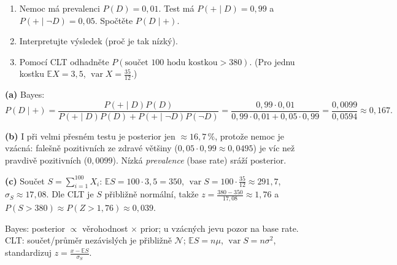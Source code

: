 \begin{zadani}
\begin{enumerate}[label=(\alph*)]
  \item {} Nemoc má prevalenci $P(D)=0{,}01$. Test má $P(+\mid D)=0{,}99$ a $P(+\mid \neg D)=0{,}05$. Spočtěte $P(D\mid +)$.
  \item {} Interpretujte výsledek (proč je tak nízký).
  \item {} Pomocí CLT odhadněte $P(\text{součet }100\text{ hodu kostkou}>380)$. (Pro jednu kostku $\mathbb{E}X=3{,}5$, $\operatorname{var}X=\tfrac{35}{12}$.)
\end{enumerate}
\end{zadani}

\begin{reseni}
\textbf{(a)} Bayes:
\[
P(D\mid+)=\frac{P(+\mid D)P(D)}{P(+\mid D)P(D)+P(+\mid\neg D)P(\neg D)}=\frac{0{,}99\cdot0{,}01}{0{,}99\cdot0{,}01+0{,}05\cdot0{,}99}=\frac{0{,}0099}{0{,}0594}\approx0{,}167.
\]

\textbf{(b)} I při velmi přesném testu je posterior jen $\approx16{,}7\,\%$, protože nemoc je vzácná: falešně pozitivních ze zdravé většiny ($0{,}05\cdot0{,}99\approx0{,}0495$) je víc než pravdivě pozitivních ($0{,}0099$). Nízká \emph{prevalence} (base rate) sráží posterior.

\textbf{(c)} Součet $S=\sum_{i=1}^{100}X_i$: $\mathbb{E}S=100\cdot3{,}5=350$, $\operatorname{var}S=100\cdot\tfrac{35}{12}\approx291{,}7$, $\sigma_S\approx17{,}08$. Dle CLT je $S$ přibližně normální, takže $z=\frac{380-350}{17{,}08}\approx1{,}76$ a $P(S>380)\approx P(Z>1{,}76)\approx0{,}039$.
\end{reseni}

\begin{jadro}
Bayes: posterior $\propto$ věrohodnost $\times$ prior; u vzácných jevu pozor na base rate. CLT: součet/průměr nezávislých je přibližně $\mathcal{N}$; $\mathbb{E}S=n\mu$, $\operatorname{var}S=n\sigma^2$, standardizuj $z=\frac{x-\mathbb{E}S}{\sigma_S}$.
\end{jadro}

